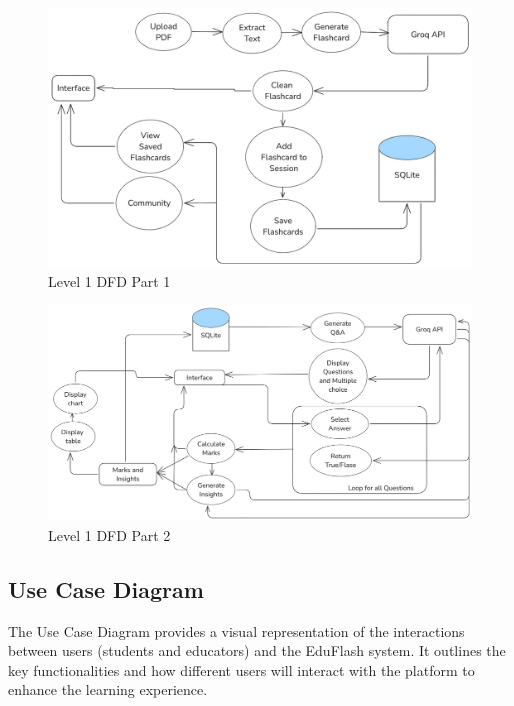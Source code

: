 \documentclass{report}
\begin{document}
\begin{figure}[h]
    \centering
    \includegraphics[width=\textwidth]{DFD level 1 part 1.png}
    \caption{Level 1 DFD Part 1}
\end{figure}
\begin{figure}[h]
    \centering
    \includegraphics[width=\textwidth]{DFD level 1 part 2.png}
    \caption{Level 1 DFD Part 2}
\end{figure}
\clearpage

\vspace{-\baselineskip} %

\subsection{Use Case Diagram}
\Large
The Use Case Diagram provides a visual representation of the interactions between users (students and educators) and the EduFlash system. It outlines the key functionalities and how different users will interact with the platform to enhance the learning experience. \\
\end{document}
